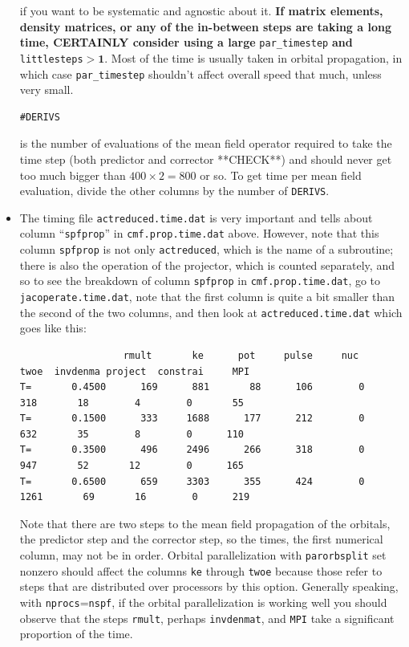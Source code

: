 \documentclass[10pt,leqno, oneside]{book}
\begin{document}
\begin{itemize}
{if you want to be systematic and agnostic about it. \textbf{If matrix elements, density
matrices, or any of the in-between steps are taking a long time, CERTAINLY consider using a large} \verb#par_timestep#
\textbf{and} \verb#littlesteps#$\bm{>1}$.
 Most of the time is usually taken
in orbital propagation, in which case \verb#par_timestep# shouldn't affect overall speed that much, unless very small.  \begin{verbatim}#DERIVS\end{verbatim} is the number
of evaluations of the mean field operator required to take the time step (both predictor and corrector **CHECK**) and should never get too much bigger than 
$400 \times 2 = 800$ or so.  To get time per mean field evaluation, divide the other columns by the number of \verb#DERIVS#.}
%
\item{The timing file \verb#actreduced.time.dat# is very important and tells about column ``\verb#spfprop#'' in \verb#cmf.prop.time.dat# above.
However, note that this column \verb#spfprop# is not only \verb#actreduced#, which is the name of a subroutine; 
there is also the operation of the projector, which is counted
separately, and so to see the breakdown of column \verb#spfprop# in \verb#cmf.prop.time.dat#, go to \verb#jacoperate.time.dat#, note that
the first column is quite a bit smaller than the second of the two columns, and then look at \verb#actreduced.time.dat# which goes like this:
{\footnotesize
\begin{verbatim}
                  rmult       ke      pot     pulse     nuc     twoe  invdenma project  constrai     MPI 
T=       0.4500      169      881       88      106        0      318       18        4        0       55
T=       0.1500      333     1688      177      212        0      632       35        8        0      110
T=       0.3500      496     2496      266      318        0      947       52       12        0      165
T=       0.6500      659     3303      355      424        0     1261       69       16        0      219
\end{verbatim}}
Note that there are two steps to the mean field propagation of the orbitals, 
the predictor step and the corrector step, 
so the times, the first numerical column, may not be in order.  Orbital parallelization with \verb#parorbsplit# set nonzero should affect the columns
\verb#ke# through \verb#twoe# because those refer to steps that are distributed over processors by this option.  Generally speaking, with \verb#nprocs#=\verb#nspf#,
if the orbital parallelization is working well you should observe that the steps \verb#rmult#, perhaps \verb#invdenmat#, and \verb#MPI# take a significant proportion of the time.
}
\end{itemize}
\end{document}
